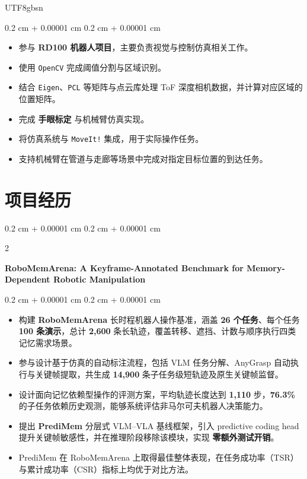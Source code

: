 \documentclass[10pt, letterpaper]{article}
\newenvironment{highlights}{
    \begin{itemize}[
        topsep=0.10 cm,
        parsep=0.10 cm,
        partopsep=0pt,
        itemsep=0pt,
        leftmargin=0.4 cm + 10pt
    ]
}{
    \end{itemize}
} %
\newenvironment{onecolentry}{
    \begin{adjustwidth}{
        0.2 cm + 0.00001 cm
    }{
        0.2 cm + 0.00001 cm
    }
}{
    \end{adjustwidth}
} %
\newenvironment{twocolentry}[2][]{
    \onecolentry
    \def\secondColumn{#2}
    \setcolumnwidth{\fill, 4.5 cm}
    \begin{paracol}{2}
}{
    \switchcolumn \raggedleft \secondColumn
    \end{paracol}
    \endonecolentry
} %
\begin{document}
\begin{CJK*}{UTF8}{gbsn}
\vspace{0.10 cm}
\begin{onecolentry}
    \begin{highlights}
        \item 参与 \textbf{RD100 机器人项目}，主要负责视觉与控制仿真相关工作。
        \item 使用 \texttt{OpenCV} 完成阈值分割与区域识别。
        \item 结合 \texttt{Eigen}、\texttt{PCL} 等矩阵与点云库处理 ToF 深度相机数据，并计算对应区域的位置矩阵。
        \item 完成 \textbf{手眼标定} 与机械臂仿真实现。
        \item 将仿真系统与 \texttt{MoveIt!} 集成，用于实际操作任务。
        \item 支持机械臂在管道与走廊等场景中完成对指定目标位置的到达任务。
    \end{highlights}
\end{onecolentry}

\section{项目经历}

\begin{twocolentry}{}
    \begin{minipage}[t]{\textwidth}
        \justifying
        \textbf{RoboMemArena: A Keyframe-Annotated Benchmark for Memory-Dependent Robotic Manipulation}
    \end{minipage}
\end{twocolentry}

\vspace{0.10 cm}
\begin{onecolentry}
    \begin{highlights}
        \item 构建 \textbf{RoboMemArena} 长时程机器人操作基准，涵盖 \textbf{26 个任务}、每个任务 \textbf{100 条演示}，总计 \textbf{2,600} 条长轨迹，覆盖转移、遮挡、计数与顺序执行四类记忆需求场景。
        \item 参与设计基于仿真的自动标注流程，包括 VLM 任务分解、AnyGrasp 自动执行与关键帧提取，共生成 \textbf{14,900} 条子任务级短轨迹及原生关键帧监督。
        \item 设计面向记忆依赖型操作的评测方案，平均轨迹长度达到 \textbf{1,110} 步，\textbf{76.3\%} 的子任务依赖历史观测，能够系统评估非马尔可夫机器人决策能力。
        \item 提出 \textbf{PrediMem} 分层式 VLM--VLA 基线框架，引入 predictive coding head 提升关键帧敏感性，并在推理阶段移除该模块，实现 \textbf{零额外测试开销}。
        \item PrediMem 在 RoboMemArena 上取得最佳整体表现，在任务成功率（TSR）与累计成功率（CSR）指标上均优于对比方法。
    \end{highlights}
\end{onecolentry}


\end{CJK*}
\end{document}
